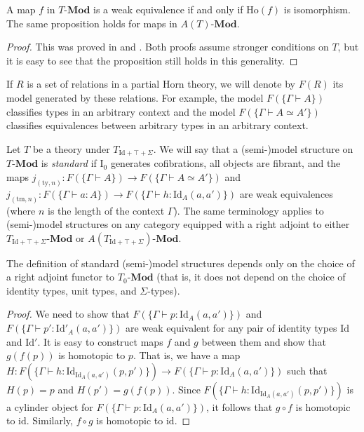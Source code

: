 \documentclass[reqno]{amsart}
\theoremstyle{definition}
\theoremstyle{remark}
\newcommand{\fs}[1]{\mathrm{#1}}
\newcommand{\bcat}[1]{\mathbf{#1}}
\newcommand{\Mod}[1]{#1\text{-}\bcat{Mod}}
\newcommand{\I}{\fs{I}}
\numberwithin{figure}{section}
\begin{document}
\begin{prop}
A map $f$ in $\Mod{T}$ is a weak equivalence if and only if $\fs{Ho}(f)$ is isomorphism.
The same proposition holds for maps in $\Mod{A(T)}$.
\end{prop}
\begin{proof}
This was proved in \cite[Proposition~3.11]{alg-models} and \cite[Proposition~3.3]{kap-lum-model}.
Both proofs assume stronger conditions on $T$, but it is easy to see that the proposition still holds in this generality.
\end{proof}

If $R$ is a set of relations in a partial Horn theory, we will denote by $F(R)$ its model generated by these relations.
For example, the model $F(\{ \Gamma \vdash A \})$ classifies types in an arbitrary context and the model $F(\{ \Gamma \vdash A \simeq A' \})$ classifies equivalences between arbitrary types in an arbitrary context.

\begin{defn}
Let $T$ be a theory under $T_{\fs{Id} + \top + \Sigma}$.
We will say that a (semi-)model structure on $\Mod{T}$ is \emph{standard} if $\I_0$ generates cofibrations, all objects are fibrant,
and the maps $j_{(\fs{ty},n)} : F(\{ \Gamma \vdash A \}) \to F(\{ \Gamma \vdash A \simeq A' \})$ and $j_{(\fs{tm},n)} : F(\{ \Gamma \vdash a : A \}) \to F(\{ \Gamma \vdash h : \fs{Id}_A(a,a') \})$ are weak equivalences (where $n$ is the length of the context $\Gamma$).
The same terminology applies to (semi-)model structures on any category equipped with a right adjoint to either $\Mod{T_{\fs{Id} + \top + \Sigma}}$ or $\Mod{A(T_{\fs{Id} + \top + \Sigma})}$.
\end{defn}

\begin{prop}
The definition of standard (semi-)model structures depends only on the choice of a right adjoint functor to $\Mod{T_0}$ (that is, it does not depend on the choice of identity types, unit types, and $\Sigma$-types).
\end{prop}
\begin{proof}
We need to show that $F(\{ \Gamma \vdash p : \fs{Id}_A(a,a') \})$ and $F(\{ \Gamma \vdash p' : \fs{Id}'_A(a,a')\})$ are weak equivalent for any pair of identity types $\fs{Id}$ and $\fs{Id}'$.
It is easy to construct maps $f$ and $g$ between them and show that $g(f(p))$ is homotopic to $p$.
That is, we have a map $H : F(\{ \Gamma \vdash h : \fs{Id}_{\fs{Id}_A(a,a')}(p,p') \}) \to F(\{ \Gamma \vdash p : \fs{Id}_A(a,a') \})$ such that $H(p) = p$ and $H(p') = g(f(p))$.
Since $F(\{ \Gamma \vdash h : \fs{Id}_{\fs{Id}_A(a,a')}(p,p') \})$ is a cylinder object for $F(\{ \Gamma \vdash p : \fs{Id}_A(a,a') \})$, it follows that $g \circ f$ is homotopic to $\fs{id}$.
Similarly, $f \circ g$ is homotopic to $\fs{id}$.
\end{proof}
\end{document}
